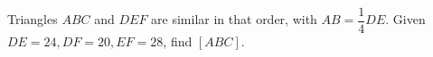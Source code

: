 Triangles $ABC$ and $DEF$ are similar in that order, with $AB=\dfrac{1}{4}DE$. Given $DE=24,DF=20,EF=28$, find $[ABC]$.
